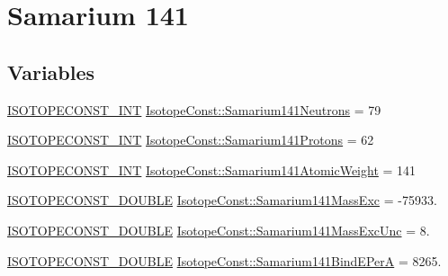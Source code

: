 \hypertarget{group___isotope_const-_samarium-_sm141}{}\section{Samarium 141}
\label{group___isotope_const-_samarium-_sm141}
\subsection*{Variables}
\begin{DoxyCompactItemize}
\item 
\mbox{\hyperlink{group___isotope_const-_macros_ga5f18360b3e99483a35c32d789e62621c}{I\+S\+O\+T\+O\+P\+E\+C\+O\+N\+S\+T\+\_\+\+I\+NT}} \mbox{\hyperlink{group___isotope_const-_samarium-_sm141_ga5336cfff89cb448ca250940275651aa4}{Isotope\+Const\+::\+Samarium141\+Neutrons}} = 79
\item 
\mbox{\hyperlink{group___isotope_const-_macros_ga5f18360b3e99483a35c32d789e62621c}{I\+S\+O\+T\+O\+P\+E\+C\+O\+N\+S\+T\+\_\+\+I\+NT}} \mbox{\hyperlink{group___isotope_const-_samarium-_sm141_ga7a82da0a945d19f1fa54069d5fcdda1d}{Isotope\+Const\+::\+Samarium141\+Protons}} = 62
\item 
\mbox{\hyperlink{group___isotope_const-_macros_ga5f18360b3e99483a35c32d789e62621c}{I\+S\+O\+T\+O\+P\+E\+C\+O\+N\+S\+T\+\_\+\+I\+NT}} \mbox{\hyperlink{group___isotope_const-_samarium-_sm141_ga4dee0511b092ad6850c9b7d1a7ce6c65}{Isotope\+Const\+::\+Samarium141\+Atomic\+Weight}} = 141
\item 
\mbox{\hyperlink{group___isotope_const-_macros_ga8f45a7272ce02c0b4c65c44636ed719a}{I\+S\+O\+T\+O\+P\+E\+C\+O\+N\+S\+T\+\_\+\+D\+O\+U\+B\+LE}} \mbox{\hyperlink{group___isotope_const-_samarium-_sm141_ga5100cdb9af2b0278ef25aa48540d993b}{Isotope\+Const\+::\+Samarium141\+Mass\+Exc}} = -\/75933.
\item 
\mbox{\hyperlink{group___isotope_const-_macros_ga8f45a7272ce02c0b4c65c44636ed719a}{I\+S\+O\+T\+O\+P\+E\+C\+O\+N\+S\+T\+\_\+\+D\+O\+U\+B\+LE}} \mbox{\hyperlink{group___isotope_const-_samarium-_sm141_ga508490c81d4c800bc83010d7fe97db4d}{Isotope\+Const\+::\+Samarium141\+Mass\+Exc\+Unc}} = 8.
\item 
\mbox{\hyperlink{group___isotope_const-_macros_ga8f45a7272ce02c0b4c65c44636ed719a}{I\+S\+O\+T\+O\+P\+E\+C\+O\+N\+S\+T\+\_\+\+D\+O\+U\+B\+LE}} \mbox{\hyperlink{group___isotope_const-_samarium-_sm141_gac9e301b837a88f5909bff1f9cb123684}{Isotope\+Const\+::\+Samarium141\+Bind\+E\+PerA}} = 8265.
\item 

\end{DoxyCompactItemize}
